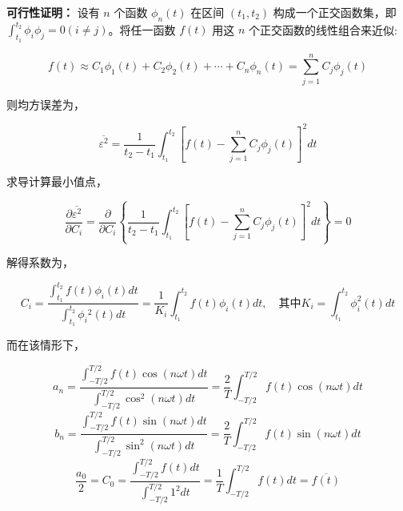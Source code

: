 \documentclass[UTF8]{article}
\theoremstyle{definition}
\begin{document}
\begin{framed}
\textbf{可行性证明：}
设有 $n$ 个函数 $\phi_n(t)$ 在区间 $\left(t_1, t_2\right)$ 构成一个正交函数集，即$\int_{t_1}^{t_2}\phi_i \phi_j =0 (i\ne j)$。将任一函数 $f(t)$ 用这 $n$ 个正交函数的线性组合来近似:

\begin{equation*}
f(t) \approx C_1 \phi_1(t)+C_2 \phi_2(t)+\cdots+C_n \phi_n(t)=\sum_{j=1}^n C_j \phi_j(t)
\end{equation*}

则均方误差为，

\begin{equation*}
\overline{\varepsilon^2}=\frac{1}{t_2-t_1} \int_{t_1}^{t_2}\left[f(t)-\sum_{j=1}^n C_j \phi_j(t)\right]^2 d t
\end{equation*}

求导计算最小值点，

\begin{equation*}
\frac{\partial \overline{\varepsilon^2}}{\partial C_i}=\frac{\partial}{\partial C_i}\left\{\frac{1}{t_2-t_1} \int_{t_1}^{t_2}\left[f(t)-\sum_{j=1}^n C_j \phi_j(t)\right]^2 d t\right\}=0
\end{equation*}

解得系数为，

\begin{equation*}
C_i=\frac{\int_{t_1}^{t_2} f(t) \phi_i(t) d t}{\int_{t_1}^{t_2} \phi_i{ }^2(t) d t}=\frac{1}{K_i} \int_{t_1}^{t_2} f(t) \phi_i(t) d t ,\quad \text{其中}K_i=\int_{t_1}^{t_2} \phi_i^2(t) d t
\end{equation*}

而在该情形下，

\begin{equation*}
a_n = \frac{\int_{-T / 2}^{T / 2} f(t) \cos(n \omega t) d t}{\int_{-T / 2}^{T / 2} \cos^2(n \omega t) d t} = \frac{2}{T} \int_{-T / 2}^{T / 2} f(t) \cos(n \omega t) d t 
\end{equation*}
\begin{equation*}
b_n = \frac{\int_{-T / 2}^{T / 2} f(t) \sin(n \omega t) d t}{\int_{-T / 2}^{T / 2} \sin^2(n \omega t) d t} = \frac{2}{T} \int_{-T / 2}^{T / 2} f(t) \sin(n \omega t) d t 
\end{equation*}
\begin{equation*}
\frac{a_0}{2} = C_0 = \frac{\int_{-T / 2}^{T / 2} f(t) d t}{\int_{-T / 2}^{T / 2} 1^2 d t} = \frac{1}{T} \int_{-T / 2}^{T / 2} f(t) d t = \overline{f(t)}
\end{equation*}
\end{framed}
\end{document}

